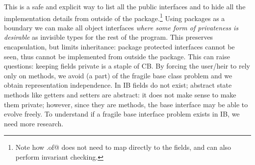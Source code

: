 \noindent This is a safe and explicit way to list all the public interfaces and to hide all the implementation
details from outside of the package.\footnote{
Note how \Q@ExposedData.of@ does not need to map directly to the fields, and can also perform
invariant checking.}
Using packages as a boundary we can make all object interfaces \emph{where some form of privateness is desirable}
as invisible types for the rest of the program.
This preserves encapsulation, but limits inheritance:
package protected interfaces cannot be seen,
thus cannot be implemented from outside the package.
This can raise questions: keeping fields private is a staple of CB.
By forcing the user/heir to rely only on methods, we avoid (a part)
of the fragile base class problem and we obtain representation independence.
In IB fields do not exist; abstract state methods like getters and
setters are abstract: it does not make sense to make them private;
however, since they are methods, the base interface may be able to
evolve freely.  To understand if a fragile base interface problem
exists in IB, we need more research.

%
%
%
%
%
%



